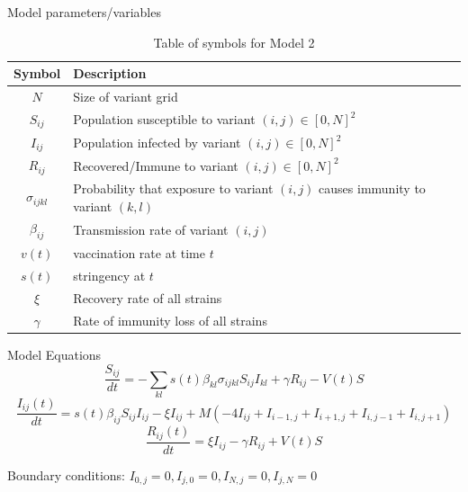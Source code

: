 \documentclass{beamer}
\begin{document}
    
\begin{frame}{Model parameters/variables}
    \begin{table}[h!]
        \begin{center}
        \begin{tabular}{c|p{8cm}}
                Symbol & Description\\
                \hline
                \hline
                $N$ & Size of variant grid \\
                $S_{ij}$ & Population susceptible to variant $(i,j) \in [0,N]^2$ \\
                $I_{ij}$ & Population infected by variant $(i,j) \in [0,N]^2$\\
                $R_{ij}$ & Recovered/Immune to variant $(i,j) \in [0,N]^2$\\
                $\sigma_{ijkl}$ & Probability that exposure to variant $(i,j)$ causes immunity \newline to variant $(k,l)$\\
                $\beta_{ij}$ & Transmission rate of variant $(i,j)$\\
                $v(t)$ & vaccination rate at time $t$\\
                $s(t)$ & stringency at $t$\\
                $\xi$ & Recovery rate of all strains \\
                $\gamma$ & Rate of immunity loss of all strains \\
        \end{tabular}
        \caption{Table of symbols for Model 2}
    
        \label{variables_2}
        \end{center}
    \end{table}
\end{frame}
\begin{frame}{Model Equations}
    \small
    \begin{equation}
        \frac{S_{ij}}{dt} = -\sum_{kl} s(t) \beta_{kl} \sigma_{ijkl} S_{ij} I_{kl} + \gamma R_{ij} - V(t)S  \label{Seqn}
    \end{equation}
    \begin{equation}
        \frac{ I_{ij}(t)}{dt} = s(t) \beta_{ij} S_{ij} I_{ij} - \xi I_{ij} + M \left(- 4I_{ij} + I_{i-1,j}  + I_{i+1,j} + I_{i,j-1} + I_{i,j+1} \right) \label{Ieqn}    
    \end{equation}
    \begin{equation}
        \frac{R_{ij}(t)}{dt} = \xi I_{ij} - \gamma R_{ij} + V(t)S \label{Reqn}
    \end{equation}

    Boundary conditions: $I_{0,j} = 0, I_{j,0} = 0,  I_{N,j} = 0, I_{j,N} = 0$
\end{frame}
\end{document}
